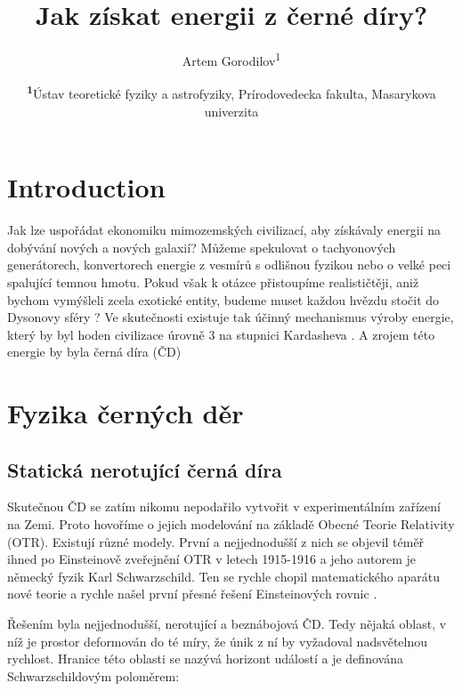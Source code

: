 \documentclass[
	a4paper, %
	10pt, %
	unnumberedsections, %
	twoside, %
]{LTJournalArticle}
\title{Jak získat energii z černé díry?} %
\author{%
	Artem Gorodilov\textsuperscript{1}
}
\date{\footnotesize\textsuperscript{\textbf{1}}Ústav teoretické fyziky a astrofyziky, Prírodovedecka fakulta, Masarykova univerzita}
\begin{document}
\maketitle %


\section{Introduction}

Jak lze uspořádat ekonomiku mimozemských civilizací, aby získávaly energii na dobývání nových a nových galaxií? Můžeme spekulovat o tachyonových generátorech, konvertorech energie z vesmírů s odlišnou fyzikou nebo o velké peci spalující temnou hmotu. Pokud však k otázce přistoupíme realističtěji, aniž bychom vymýšleli zcela exotické entity, budeme muset každou hvězdu stočit do Dysonovy sféry \autocite{dyson1960}? Ve skutečnosti existuje tak účinný mechanismus výroby energie, který by byl hoden civilizace úrovně 3 na stupnici Kardasheva \autocite{kardashev1964}. A zrojem této energie by byla černá díra (ČD)


\section{Fyzika černých děr}

\subsection{Statická nerotující černá díra}

Skutečnou ČD se zatím nikomu nepodařilo vytvořit v experimentálním zařízení na Zemi. Proto hovoříme o jejich modelování na základě Obecné Teorie Relativity (OTR). Existují různé modely. První a nejjednodušší z nich se objevil téměř ihned po Einsteinově zveřejnění OTR v letech 1915-1916 a jeho autorem je německý fyzik Karl Schwarzschild. Ten se rychle chopil matematického aparátu nové teorie a rychle našel první přesné řešení Einsteinových rovnic \autocite{schwarzschild1999}. 

Řešením byla nejjednodušší, nerotující a beznábojová ČD. Tedy nějaká oblast, v níž je prostor deformován do té míry, že únik z ní by vyžadoval nadsvětelnou rychlost. Hranice této oblasti se nazývá horizont událostí a je definována Schwarzschildovým poloměrem:
\end{document}
